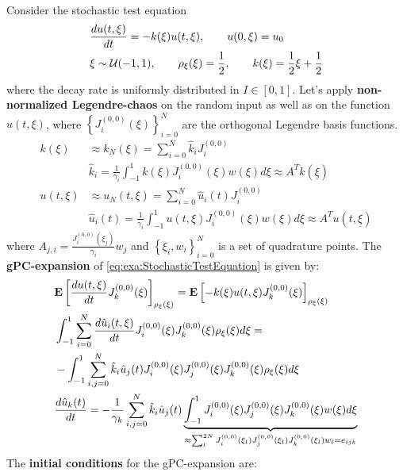 \documentclass[a4paper,10pt]{article}
\begin{document}
\begin{exa}\label{exa:StochasticTestEquation-gPC}
\mbox{}\\
Consider the stochastic test equation
\begin{align}
	&\frac{du(t,\xi)}{dt} = -k(\xi) u(t,\xi), \qquad u(0,\xi) = u_0\label{eq:exa:StochasticTestEquation} \\
	&\xi \sim \mathcal{U}(-1,1), \qquad \rho_\xi(\xi)= \frac{1}{2}, \qquad k(\xi) = \frac{1}{2}\xi + \frac{1}{2} \notag
\end{align}
where the decay rate is uniformly distributed in $I \in [0,1]$. Let's apply \textbf{non-normalized Legendre-chaos} on the random input as well as on the function $u(t,\xi)$, where $\left\lbrace J_i^{(0,0)}(\xi) \right\rbrace_{i=0}^N $ are the orthogonal Legendre basis functions.
\begin{align}
	k(\xi) &\approx k_N(\xi) = \sum_{i=0}^N \hat{k}_i J_i^{(0,0)} \\
		&\hat{k}_i = \frac{1}{\gamma_i} \int_{-1}^{1} k(\xi)J_i^{(0,0)}(\xi)w(\xi)d\xi \approx A^T k(\underline{\xi}) \\
	u(t,\xi) &\approx u_N(t,\xi) = \sum_{i=0}^N \hat{u}_i(t) J_i^{(0,0)} \\
		&\hat{u}_i(t) = \frac{1}{\gamma_i} \int_{-1}^{1} u(t,\xi)J_i^{(0,0)}(\xi)w(\xi)d\xi \approx A^T u(t,\underline{\xi})
\end{align}
where $ A_{j,i} = \frac{J_i^{(0,0)}(\xi_j)}{\gamma_i} w_j $ and $\left\lbrace \xi_i, w_i \right\rbrace_{i=0}^N $ is a set of quadrature points. The \textbf{gPC-expansion} of \eqref{eq:exa:StochasticTestEquation} is given by:
\begin{align}
	&\mathbf{E}\left[ \frac{du(t,\xi)}{dt} J_k^{(0,0)}(\xi) \right]_{\rho_\xi(\xi)} = \mathbf{E}\left[ -k(\xi)u(t,\xi)J_k^{(0,0)}(\xi) \right]_{\rho_\xi(\xi)}\\
	&\int_{-1}^1 \sum_{i=0}^N \frac{d\hat{u}_i(t,\xi)}{dt} J_i^{(0,0)}(\xi) J_k^{(0,0)}(\xi) \rho_\xi(\xi)d\xi = \\ &-\int_{-1}^1 \sum_{i,j=0}^N \hat{k}_i \hat{u}_j(t) J_i^{(0,0)}(\xi) J_j^{(0,0)}(\xi) J_k^{(0,0)}(\xi) \rho_\xi(\xi) d\xi \notag \\
	& \frac{d\hat{u}_k(t)}{dt} = -\frac{1}{\gamma_k} \sum_{i,j=0}^N \hat{k}_i \hat{u}_j(t) \underbrace{\int_{-1}^1 J_i^{(0,0)}(\xi) J_j^{(0,0)}(\xi) J_k^{(0,0)}(\xi) w(\xi) d\xi}_{\approx \sum_l^{2N} J_i^{(0,0)}(\xi_l) J_j^{(0,0)}(\xi_l) J_k^{(0,0)}(\xi_l) w_l = e_{ijk}}
\end{align}
The \textbf{initial conditions} for the gPC-expansion are:

\end{exa}
\end{document}
